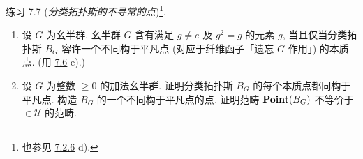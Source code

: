 \begin{enonce*}[remark]{练习 7.7}
(\emph{分类拓扑斯的不寻常的点})\footnote[1]{也参见 \hyperref[IV.exer7.2.6]{7.2.6} d).}.
\begin{enumerate}
\renewcommand{\theenumi}{\alph{enumi}}
\renewcommand{\labelenumi}{\theenumi)}
\item 设 $G$ 为幺半群. 幺半群 $G$ 含有满足 $g\neq e$ 及 $g^2=g$ 的元素 $g$, 当且仅当分类拓扑斯 $B_G$ 容许一个不同构于平凡点 (对应于纤维函子「遗忘 $G$ 作用」) 的本质点. (用 \hyperref[IV.exer7.6]{7.6} e).)

\item 设 $G$ 为整数 $\geq 0$ 的加法幺半群. 证明分类拓扑斯 $B_G$ 的每个本质点都同构于平凡点. 构造 $B_G$ 的一个不同构于平凡点的点. 证明范畴 $\operatorname{\mathbf{Point}}(B_G)$ 不等价于 $\in 𝒰$ 的范畴.
\end{enumerate}
\end{enonce*}

